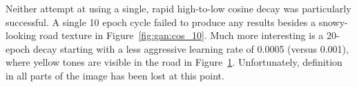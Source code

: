 \documentclass[10pt,twocolumn,letterpaper]{article}
\begin{document}
\begin{figure}

	
	\caption{}
	\label{fig:gan:cos_20}

\end{figure}

Neither attempt at using a single, rapid high-to-low cosine decay was particularly successful. A single 10 epoch cycle failed to produce any results besides a snowy-looking road texture in Figure~\ref{fig:gan:cos_10}. Much more interesting is a 20-epoch decay starting with a less aggressive learning rate of 0.0005 (versus 0.001), where yellow tones are visible in the road in Figure~\ref{fig:gan:cos_20}. Unfortunately, definition in all parts of the image has been lost at this point.
\end{document}

